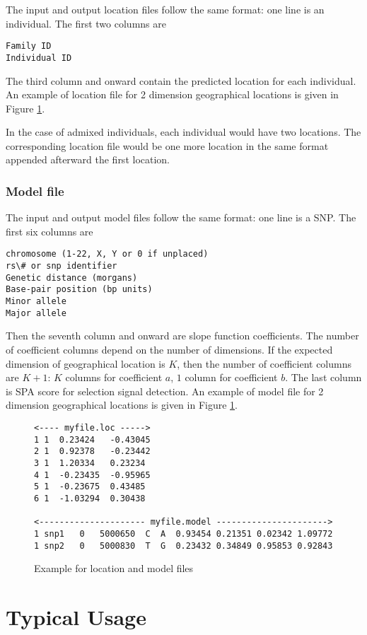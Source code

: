 \documentclass[12pt]{article}
\begin{document}
The input and output location files follow the same format: one line is an individual. The first
two columns are 
\begin{verbatim}
Family ID
Individual ID
\end{verbatim}
The third column and onward contain the predicted location for each individual. An example of
location file for 2 dimension geographical locations is given in Figure \ref{fig:model_file}.

In the case of admixed individuals, each individual would have two locations. The corresponding
location file would be one more location in the same format appended afterward the first location.

\subsubsection*{Model file}

The input and output model files follow the same format: one line is a SNP. The first six columns are 
\begin{verbatim}
chromosome (1-22, X, Y or 0 if unplaced)
rs\# or snp identifier
Genetic distance (morgans)
Base-pair position (bp units)
Minor allele
Major allele
\end{verbatim}
Then the seventh column and onward are slope function coefficients. The number of coefficient columns
depend on the number of dimensions. If the expected dimension of geographical location is $K$, then
the number of coefficient columns are $K+1$: $K$ columns for coefficient $a$, $1$ column for coefficient 
$b$. The last column is SPA score for selection signal detection. 
An example of model file for 2 dimension geographical locations is given in Figure
\ref{fig:model_file}.

\begin{figure}
\begin{verbatim}
<---- myfile.loc ----->              
1 1  0.23424   -0.43045              
2 1  0.92378   -0.23442              
3 1  1.20334   0.23234
4 1  -0.23435  -0.95965
5 1  -0.23675  0.43485
6 1  -1.03294  0.30438

<--------------------- myfile.model ---------------------->
1 snp1   0   5000650  C  A  0.93454 0.21351 0.02342 1.09772
1 snp2   0   5000830  T  G  0.23432 0.34849 0.95853 0.92843
\end{verbatim}
\caption{Example for location and model files}\label{fig:model_file}
\end{figure}

\section*{Typical Usage}
\end{document}
